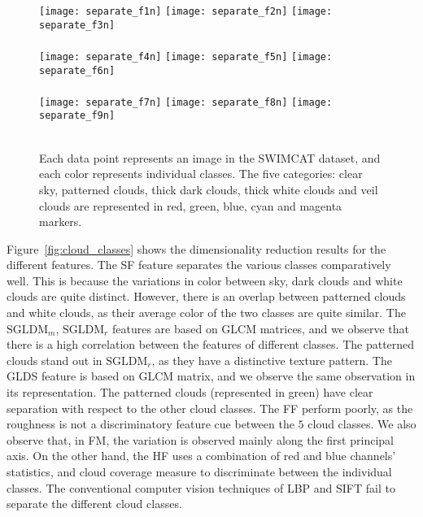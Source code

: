 \begin{figure}[htb]
\centering
\texttt{[image: separate\_f1n]}
\texttt{[image: separate\_f2n]}
\texttt{[image: separate\_f3n]}\\
\\
\texttt{[image: separate\_f4n]}
\texttt{[image: separate\_f5n]}
\texttt{[image: separate\_f6n]}\\
\\
\texttt{[image: separate\_f7n]}
\texttt{[image: separate\_f8n]}
\texttt{[image: separate\_f9n]}\\
\\
\caption[Visual representation of various cloud features in lower dimensional subspace.]{Each data point represents an image in the SWIMCAT dataset, and each color represents individual classes. The five categories: clear sky, patterned clouds, thick dark clouds, thick white clouds and veil clouds are represented in red, green, blue, cyan and magenta markers.}
\label{fig:separation}
\end{figure}

Figure~\ref{fig:cloud_classes} shows the dimensionality reduction results for the different features. The SF feature separates the various classes comparatively well. This is because the variations in color between sky, dark clouds and white clouds are quite distinct. However, there is an overlap between patterned clouds and white clouds, as their average color of the two classes are quite similar. The $\mbox{SGLDM}_m$, $\mbox{SGLDM}_r$ features are based on GLCM matrices, and we observe that there is a high correlation between the features of different classes. The patterned clouds stand out in $\mbox{SGLDM}_r$, as they have a distinctive texture pattern. The GLDS feature is based on GLCM matrix, and we observe the same observation in its representation. The patterned clouds (represented in green) have clear separation with respect to the other cloud classes. The FF perform poorly, as the roughness is not a discriminatory feature cue between the $5$ cloud classes. We also observe that, in FM, the variation is observed mainly along the first principal axis. On the other hand, the HF uses a combination of red and blue channels' statistics, and cloud coverage measure to discriminate between the individual classes. The conventional computer vision techniques of LBP and SIFT fail to separate the different cloud classes. 

